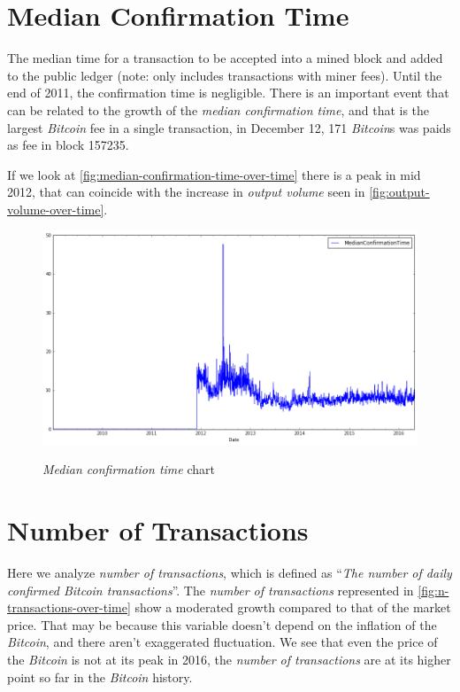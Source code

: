 
\section{Median Confirmation Time}
\label{sec:median-confirmation-time}

The median time for a transaction to be accepted into a mined block
and added to the public ledger (note: only includes transactions with
miner fees). Until the end of 2011, the confirmation time is
negligible. There is an important event that can be related to the
growth of the \textit{median confirmation time}, and that is the
largest \textit{Bitcoin} fee in a single transaction, in December 12,
171 \textit{Bitcoin}s was paids as fee in block 157235.

If we look at \autoref{fig:median-confirmation-time-over-time} there
is a peak in mid 2012, that can coincide with the increase in
\textit{output volume} seen in \autoref{fig:output-volume-over-time}.

\begin{figure}[bth]
  \myfloatalign
  {\includegraphics[width=1\linewidth]
    {gfx/median-confirmation-time-over-time}}
  \caption{\textit{Median confirmation time} chart}
  \label{fig:median-confirmation-time-over-time}
\end{figure}


\section{Number of Transactions}
\label{sec:n-transactions-multiple}

Here we analyze \textit{number of transactions}, which is defined as
``\textit{The number of daily confirmed \textit{Bitcoin}
transactions}''. The \textit{number of transactions} represented in
\autoref{fig:n-transactions-over-time} show a moderated growth
compared to that of the market price. That may be because this
variable doesn't depend on the inflation of the \textit{Bitcoin}, and
there aren't exaggerated fluctuation. We see that even the price of the
\textit{Bitcoin} is not at its peak in 2016, the \textit{number of
transactions} are at its higher point so far in the \textit{Bitcoin}
history.

